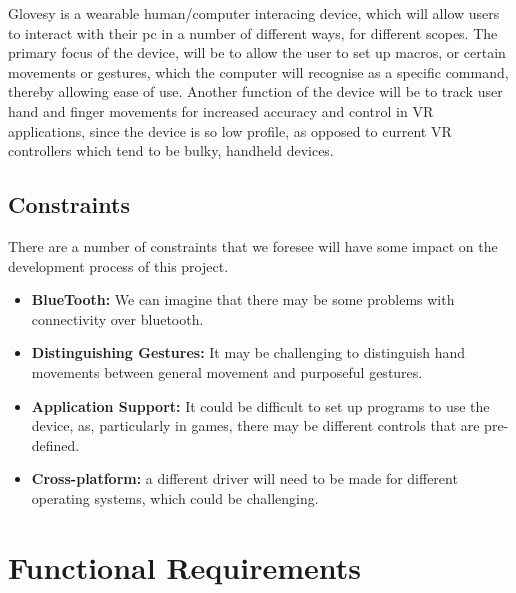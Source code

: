 \documentclass[12pt,a4paper,oneside]{book}
\theoremstyle{plain}
\numberwithin{equation}{chapter}
\begin{document}
\noindent Glovesy is a wearable human/computer interacing device, which will allow users to interact with their pc in a number of different ways, for different scopes.  The primary focus of the device, will be to allow the user to set up macros, or certain movements or gestures, which the computer will recognise as a specific command, thereby allowing ease of use. Another function of the device will be to track user hand and finger movements for increased accuracy and control in VR applications, since the device is so low profile, as opposed to current VR controllers which tend to be bulky, handheld devices.

\section{Constraints}

\noindent There are a number of constraints that we foresee will have some impact on the development process of this project.

\begin{itemize}
    \item{\textbf{BlueTooth:} We can imagine that there may be some problems with connectivity over bluetooth.}
    \item{\textbf{Distinguishing Gestures:} It may be challenging to distinguish hand movements between general movement and purposeful gestures.}
    \item{\textbf{Application Support:} It could be difficult to set up programs to use the device, as, particularly in games, there may be different controls that are pre-defined.}
    \item{\textbf{Cross-platform:} a different driver will need to be made for different operating systems, which could be challenging.}
\end{itemize}

\chapter*{Functional Requirements}
\end{document}

